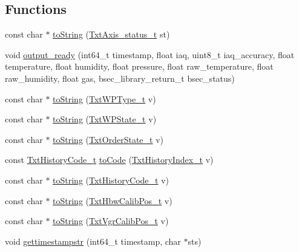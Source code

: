 \subsection*{Functions}
\begin{DoxyCompactItemize}
\item 
const char $\ast$ \hyperlink{namespaceft_a15fc2b72928c5d6bc2d7234d1086a88a}{to\+String} (\hyperlink{namespaceft_a05630ec9d5a49c43a00ca107cfe6b350}{Txt\+Axis\+\_\+status\+\_\+t} st)
\item 
void \hyperlink{namespaceft_ac1e21cee7715fad53ebff286121af45c}{output\+\_\+ready} (int64\+\_\+t timestamp, float iaq, uint8\+\_\+t iaq\+\_\+accuracy, float temperature, float humidity, float pressure, float raw\+\_\+temperature, float raw\+\_\+humidity, float gas, bsec\+\_\+library\+\_\+return\+\_\+t bsec\+\_\+status)
\item 
const char $\ast$ \hyperlink{namespaceft_a2df6621395e8718859864119a34a820a}{to\+String} (\hyperlink{namespaceft_a2d5bf01b2da29de3c061682f3195b5b2}{Txt\+W\+P\+Type\+\_\+t} v)
\item 
const char $\ast$ \hyperlink{namespaceft_a7c510ab3a75c0ed81ccd0f1836963fc4}{to\+String} (\hyperlink{namespaceft_ac089be1d932165fc32bd3838c892bce9}{Txt\+W\+P\+State\+\_\+t} v)
\item 
const char $\ast$ \hyperlink{namespaceft_afb921233dab9f6193d3f8e35b30a4eed}{to\+String} (\hyperlink{namespaceft_a0b621af47c2875bbecb5f4a3d4218a5c}{Txt\+Order\+State\+\_\+t} v)
\item 
const \hyperlink{namespaceft_a159b26268d167d1a15cca7e324a25abf}{Txt\+History\+Code\+\_\+t} \hyperlink{namespaceft_ace7db8ca138a19dc062935cda6527317}{to\+Code} (\hyperlink{namespaceft_a87eb4112317a6f3c7ade8f26b6f8c1c8}{Txt\+History\+Index\+\_\+t} v)
\item 
const char $\ast$ \hyperlink{namespaceft_a604ad08a67fc44555ecd8f373290f520}{to\+String} (\hyperlink{namespaceft_a159b26268d167d1a15cca7e324a25abf}{Txt\+History\+Code\+\_\+t} v)
\item 
const char $\ast$ \hyperlink{namespaceft_ae1f3840a401d735974abf141c1368903}{to\+String} (\hyperlink{namespaceft_a88bb8b41aa7e6a6d38447ae6f2caa4b5}{Txt\+Hbw\+Calib\+Pos\+\_\+t} v)
\item 
const char $\ast$ \hyperlink{namespaceft_a685490d6cf4f8633991baa5fab28edf1}{to\+String} (\hyperlink{namespaceft_aee2adb2339d398fc7ed033c80030e685}{Txt\+Vgr\+Calib\+Pos\+\_\+t} v)
\item 
void \hyperlink{namespaceft_a457fba32a74b3fc2648f00972731eb9d}{gettimestampstr} (int64\+\_\+t timestamp, char $\ast$sts)

\end{DoxyCompactItemize}

